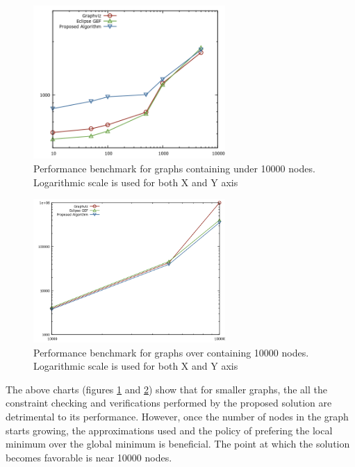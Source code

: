 \begin{figure}[ht] \centering
\includegraphics[width=0.65\textwidth]{img/results/under10000.png}
\caption{Performance benchmark for graphs containing under 10000 nodes. Logarithmic scale is used for both X and Y axis \label{chart1}} \end{figure}

\begin{figure}[ht] \centering
\includegraphics[width=0.65\textwidth]{img/results/over10000.png}
\caption{Performance benchmark for graphs over containing 10000 nodes. Logarithmic scale is used for both X and Y axis \label{chart2}} \end{figure}

The above charts (figures \ref{chart1} and \ref{chart2}) show that for smaller graphs, the all the constraint checking and verifications performed 
by the proposed solution are detrimental to its performance. However, once the number of nodes in the graph starts 
growing, the approximations used and the policy of prefering the local minimum over the global minimum is beneficial.
The point at which the solution becomes favorable is near 10000 nodes.

